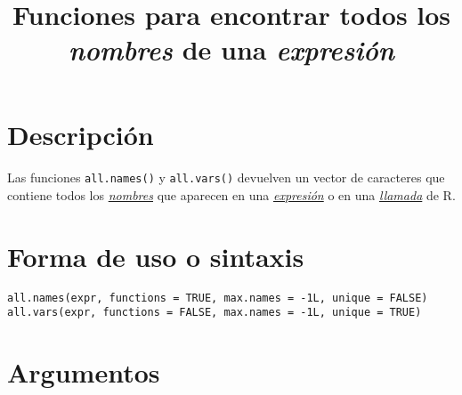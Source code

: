 \documentclass{article}[letter, 12pt]
\makeatletter
\def\code#1{\texttt{#1}}
\renewcommand{\maketitle}{\bgroup\setlength{\parindent}{0pt}
\begin{flushleft}
  \textbf{\@title}
  \@author
\end{flushleft}\egroup
}
\makeatother
\begin{document}
	\title{\Huge{Funciones para encontrar todos los \textit{nombres} de una \textit{expresión}}}
	\maketitle
	\section{\color{gray}Descripción}
	\paragraph{}
Las funciones \code{all.names()} y \code{all.vars()} devuelven un vector de caracteres que contiene todos los \href{run:/Vocabulary.pdf}{\textit{nombres}} que aparecen en una \href{run:/Vocabulary.pdf}{\textit{expresión}} o en una \href{run:/Vocabulary.pdf}{\textit{llamada}} de R.
\tableofcontents{}
\section{\color{gray}Forma de uso o sintaxis}
\code{all.names(expr, functions = TRUE, max.names = -1L, unique = FALSE)}\\
\code{all.vars(expr, functions = FALSE, max.names = -1L, unique = TRUE)}\\

\section{\color{gray}Argumentos}
\end{document}
